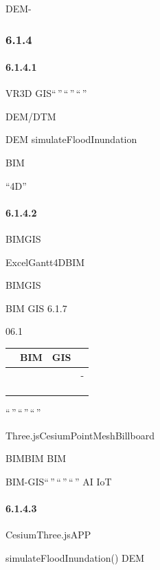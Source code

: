 DEM-

\hypertarget{section-31}{%
\subsubsection{6.1.4}\label{section-31}}

\hypertarget{section-32}{%
\paragraph{6.1.4.1}\label{section-32}}

VR3D GIS``\,''\,``\,''\,``\,''

DEM/DTM

DEM simulateFloodInundation

BIM

``4D''

\hypertarget{section-33}{%
\paragraph{6.1.4.2}\label{section-33}}

BIMGIS

ExcelGantt4DBIM

BIMGIS

BIM GIS 6.1.7


06.1

\begin{longtable}[]{@{}llll@{}}
\toprule\noalign{}
& BIM & GIS & \\
\midrule\noalign{}
\endhead
\bottomrule\noalign{}
\endlastfoot
& & & - \\
& & & \\
& & & \\
& & & \\
\end{longtable}

``\,''\,``\,''\,``\,''

Three.jsCesiumPointMeshBillboard

BIMBIM BIM

BIM-GIS``\,''\,``\,''\,``\,'' AI IoT

\hypertarget{section-34}{%
\paragraph{6.1.4.3}\label{section-34}}

CesiumThree.jsAPP

simulateFloodInundation() DEM

